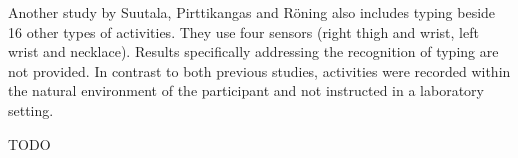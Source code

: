 \documentclass[11pt,a4paper]{paper}
\begin{document}
Another study by Suutala, Pirttikangas and Röning \cite{suutalaetal2007} also 
 includes typing beside 16 other types of activities. 
They use four sensors (right thigh and wrist, left wrist and necklace).
Results specifically addressing the recognition of typing are not provided.
In contrast to both previous studies, activities were recorded within the
 natural environment of the participant and not instructed in a laboratory setting.
 
TODO \cite{huynhetal2007}


 


 






\end{document}
